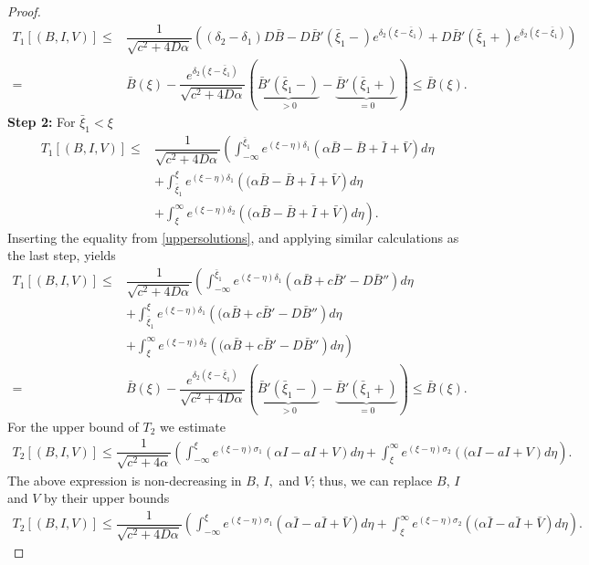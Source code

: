 \documentclass[11pt]{article}
\theoremstyle{definition}
\begin{document}
{\begin{proof}
\begin{align}
     T_1[(B,I,V)] \le & \dfrac{1}{\sqrt{c^2+4 D\alpha}} \left( (\delta_2-\delta_1 )D \bar{B} -D \bar{B}'(\bar{\xi}_1-)e^{\delta_2(\xi - \bar{\xi}_1)}+ D \bar{B}'(\bar{\xi}_1+)e^{\delta_2(\xi - \bar{\xi}_1)} \right) \\ =& \bar{B}(\xi) - \dfrac{e^{\delta_2(\xi- \bar{\xi}_1)}}{\sqrt{c^2+4D \alpha}}\left(\underbrace{\bar{B}'(\bar{\xi}_1-)}_{>0} - \underbrace{\bar{B}'(\bar{\xi}_1+)}_{=0} \right) \le \bar{B}(\xi).
     \end{align}
        \textbf{Step 2:} For $\bar{\xi}_1< \xi$\begin{align}
        T_1[(B,I,V)] \le & \dfrac{1}{\sqrt{c^2+4D \alpha}} \left( \int_{-\infty}^{\bar{\xi}_1} e^{(\xi- \eta)\delta_1} {\left(\alpha \bar B-\bar B+\bar I+\bar V \right)}d \eta \right. \\ & + \left. \int_{\bar{\xi}_1}^{\xi} e^{(\xi- \eta)\delta_1} {\left((\alpha \bar  B-\bar B+\bar I+\bar V\right)}d \eta \right. \\&+ \left. \int_{\xi}^{\infty} e^{(\xi- \eta)\delta_2} {\left((\alpha \bar  B-\bar B+\bar I+\bar V\right)}d \eta \right).
    \end{align}
    Inserting the equality from \eqref{uppersolutions}, and applying similar calculations as the last step, yields
    \begin{align}
          T_1[(B,I,V)] \le & \dfrac{1}{\sqrt{c^2+4D \alpha}} \left( \int_{-\infty}^{\bar\xi_1} e^{(\xi- \eta)\delta_1} {\left(\alpha \bar B+ c\bar B'-D\bar B'' \right)}d \eta \right. \\ & + \left. \int_{\bar\xi_1}^{{\xi}} e^{(\xi- \eta)\delta_1} {\left((\alpha \bar B+ c\bar B'-D\bar B'' \right)}d \eta \right. \\&+ \left. \int_{\xi}^{\infty} e^{(\xi- \eta)\delta_2} {\left((\alpha \bar B+ c\bar B'-D\bar B'' \right)}d \eta \right)\\ =& \bar{B}(\xi) - \dfrac{e^{\delta_2(\xi- \bar{\xi}_1)}}{\sqrt{c^2+4D \alpha}}\left(\underbrace{\bar{B}'(\bar{\xi}_1-)}_{>0} - \underbrace{\bar{B}'(\bar{\xi}_1+)}_{=0} \right) \le \bar{B}(\xi).
    \end{align}
For the upper bound of $T_2$ we estimate 
    \begin{align}
        T_2[(B,I,V)] \le \dfrac{1}{\sqrt{c^2+4 \alpha}} \left( \int_{-\infty}^{\xi} e^{(\xi- \eta)\sigma_1} {\left(\alpha  I-a I+ V \right)}d \eta +  \int_{\xi}^{\infty} e^{(\xi- \eta)\sigma_2} {\left((\alpha  I-a I+ V \right)}d \eta \right).
    \end{align}
    The above expression is non-decreasing in $B$, $I,$ and $V$; thus, we can replace $B$, $I$ and $V$ by their upper bounds 
       \begin{align}
        T_2[(B,I,V)] \le \dfrac{1}{\sqrt{c^2+4 D\alpha}} \left( \int_{-\infty}^{\xi} e^{(\xi- \eta)\sigma_1} {\left(\alpha \bar I-a\bar I+\bar V \right)}d \eta +  \int_{\xi}^{\infty} e^{(\xi- \eta)\sigma_2} {\left((\alpha \bar I-a\bar I+\bar V \right)}d \eta \right).
    \end{align}


\end{proof}}
\end{document}
